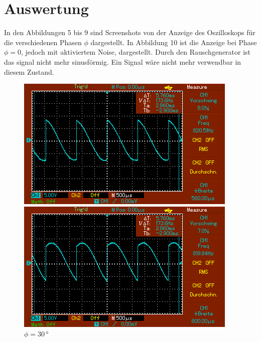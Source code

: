 \section{Auswertung}
\label{sec:Auswertung}

\begin{table}
    \centering
    
\end{table}
In den Abbildungen 5 bis 9 sind Screenshots von der Anzeige des Oszilloskops für die verschiedenen Phasen $\phi$ dargestellt. In Abbildung 10 ist
die Anzeige bei Phase $\phi = 0$, jedoch mit aktiviertem Noise, dargestellt. Durch den Rauschgenerator ist das signal nicht mehr sinusförmig. Ein Signal wäre nicht mehr verwendbar in diesem Zustand.\\
\begin{figure}
    \begin{minipage}[b]{.45\linewidth} %
       \includegraphics[width=\linewidth]{bilder/MAP003.png}
       \caption{$\phi = 0\,\unit{°}$}
    \end{minipage}
    \hspace{0.1\linewidth}%
    \begin{minipage}[b]{.45\linewidth} %
       \includegraphics[width=\linewidth]{bilder/MAP004.png}
       \caption{$\phi = 30\,\unit{°}$}
    \end{minipage}
\end{figure}

